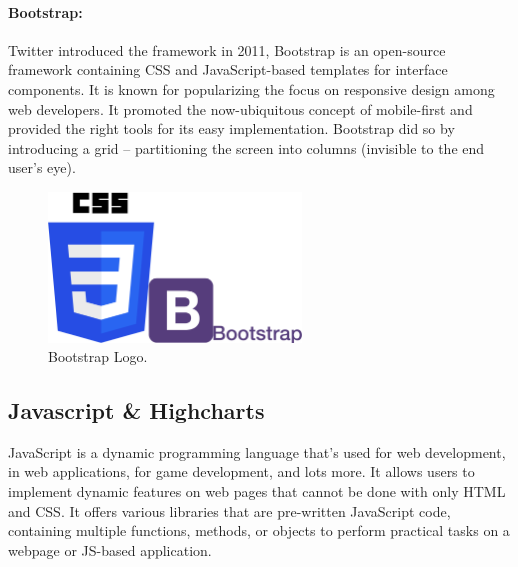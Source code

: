 \paragraph*{Bootstrap:}Twitter introduced the framework in 2011, Bootstrap\cite{BootstrapFrontendFramework2022} is an open-source framework containing CSS and JavaScript-based templates for interface components. It is known for popularizing the focus on responsive design among web developers. 
It promoted the now-ubiquitous concept of mobile-first and provided the right tools for its easy implementation. Bootstrap did so by introducing a grid – partitioning the screen into columns (invisible to the end user's eye).
\begin{figure}[h!]
    \center
    \includegraphics[width=0.60\textwidth]{images/chapter4/bootsrapCss.png}
    \caption{Bootstrap Logo.}
    \label{fig:bootstrap}
\end{figure}
\newpage

\subsection{Javascript \& Highcharts}
JavaScript\cite{JavaScriptCom} is a dynamic programming language that's used for web development, in web applications, for game development, and lots more. It allows users to implement dynamic features on web pages that cannot be done with only HTML and CSS. It offers various libraries that are pre-written JavaScript code, containing multiple functions, methods, or objects to perform practical tasks on a webpage or JS-based application.

